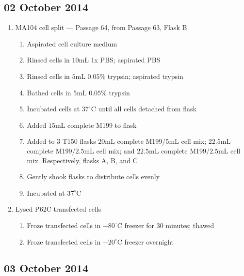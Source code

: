 
\subsection*{02 October 2014}

\begin{enumerate}
	\item MA104 cell split --- Passage 64, from Passage 63, Flask B
		\begin{enumerate}
			\item Aspirated cell culture medium
			\item Rinsed cells in $10$mL 1x PBS; aspirated PBS
			\item Rinsed cells in $5$mL $0.05$\% trypsin; aspirated trypsin
			\item Bathed cells in $5$mL $0.05$\% trypsin
			\item Incubated cells at $37^{\circ}$C until all cells detached from flask
			\item Added $15$mL complete M199 to flask
			\item Added to $3$ T150 flasks $20$mL complete M199/$5$mL cell mix; $22.5$mL complete M199/$2.5$mL cell mix; and $22.5$mL complete M199/$2.5$mL cell mix. Respectively, flasks A, B, and C
			\item Gently shook flasks to distribute cells evenly
			\item Incubated at $37^{\circ}$C
		\end{enumerate}
	\item Lysed P62C transfected cells
		\begin{enumerate}
			\item Froze transfected cells in $-80^{\circ}$C freezer for 30 minutes; thawed
			\item Froze transfected cells in $-20^{\circ}$C freezer overnight
		\end{enumerate}
\end{enumerate}


\subsection*{03 October 2014}

